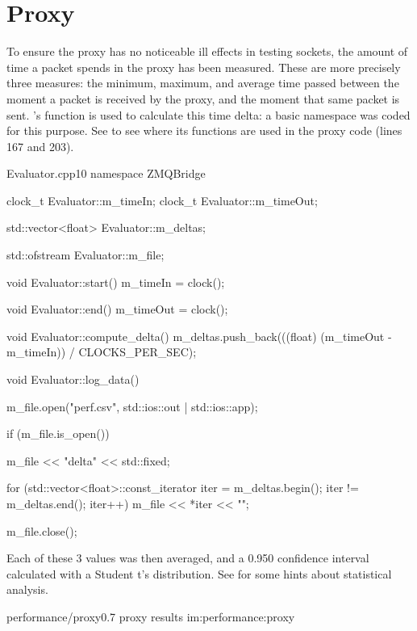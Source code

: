 \section{Proxy}\label{sc:performance:proxy}



To ensure the \gls{proxy} has no noticeable ill effects in testing  sockets, the amount of time a packet spends in the \gls{proxy} has been measured. These are more precisely three measures: the minimum, maximum, and average time passed between the moment a packet is received by the \gls{proxy}, and the moment that same packet is sent. 's  function is used to calculate this time delta: a basic  namespace was coded for this purpose. See  to see where its functions are used in the proxy code (lines \num{167} and \num{203}).

\begin{codelist}{Evaluator.cpp}{10}
namespace ZMQBridge {

clock_t Evaluator::m_timeIn;
clock_t Evaluator::m_timeOut;

std::vector<float> Evaluator::m_deltas;

std::ofstream Evaluator::m_file;

void Evaluator::start() {
    m_timeIn = clock();
}

void Evaluator::end() {
    m_timeOut = clock();
}

void Evaluator::compute_delta() {
    m_deltas.push_back(((float) (m_timeOut - m_timeIn)) / CLOCKS_PER_SEC);
}

void Evaluator::log_data() {
    m_file.open("perf.csv", std::ios::out | std::ios::app);

    if (m_file.is_open()) {
        m_file << "delta\n"
               << std::fixed;

        for (std::vector<float>::const_iterator iter = m_deltas.begin(); iter != m_deltas.end(); iter++) {
            m_file << *iter << "\n";
        }
    }

    m_file.close();
}

}
\end{codelist}

\FLOATnoindent Each of these \num{3} values was then averaged, and a \num{0,950} confidence interval calculated with a Student t's distribution. See  for some hints about statistical analysis.

\begin{image}
	{performance/proxy}{0.7}
	{proxy results}
	{im:performance:proxy}
	{}
\end{image}

